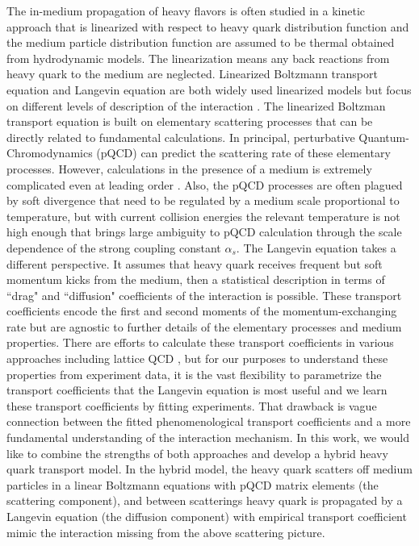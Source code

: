 \documentclass[aps, prc, reprint, amsmath, groupedaddress, nofootinbib]{revtex4-1}
\begin{document}
The in-medium propagation of heavy flavors is often studied in a kinetic approach that is linearized with respect to heavy quark distribution function and the medium particle distribution function are assumed to be thermal obtained from hydrodynamic models.
The linearization means any back reactions from heavy quark to the medium are neglected.
Linearized Boltzmann transport equation and Langevin equation are both widely used linearized models but focus on different levels of description of the interaction \cite{Auvinen:2009qm,Cao:2016gvr, Cao:2017hhk, PhysRevD.37.2484, Moore:2004tg}.
The linearized Boltzman transport equation is built on elementary scattering processes that can be directly related to fundamental calculations.
In principal, perturbative Quantum-Chromodynamics (pQCD) can predict the scattering rate of these elementary processes.
However, calculations in the presence of a medium is extremely complicated even at leading order \cite{Arnold:2002zm}.
Also, the pQCD processes are often plagued by soft divergence that need to be regulated by a medium scale proportional to temperature, but with current collision energies the relevant temperature is not high enough that brings large ambiguity to pQCD calculation through the scale dependence of the strong coupling constant $\alpha_s$.
The Langevin equation takes a different perspective. 
It assumes that heavy quark receives frequent but soft momentum kicks from the medium, then a statistical description in terms of ``drag" and ``diffusion" coefficients of the interaction is possible.
These transport coefficients encode the first and second moments of the momentum-exchanging rate but are agnostic to further details of the elementary processes and medium properties.
There are efforts to calculate these transport coefficients in various approaches including lattice QCD \cite{Moore:2004tg,CaronHuot:2008uh, Gossiaux:2008jv,He:2012df,Riek:2010fk,vanHees:2007me,Scardina:2017ipo,Ding:2012sp,Banerjee:2011ra}, but for our purposes to understand these properties from experiment data, it is the vast flexibility to parametrize the transport coefficients that the Langevin equation is most useful and we learn these transport coefficients by fitting experiments.
That drawback is vague connection between the fitted phenomenological transport coefficients and a more fundamental understanding of the interaction mechanism.
In this work, we would like to combine the strengths of both approaches
and develop a hybrid heavy quark transport model.
In the hybrid model, the heavy quark scatters off medium particles in a linear Boltzmann equations with pQCD matrix elements (the scattering component), and between scatterings heavy quark is propagated by a Langevin equation (the diffusion component) with empirical transport coefficient mimic the interaction missing from the above scattering picture.
\end{document}
